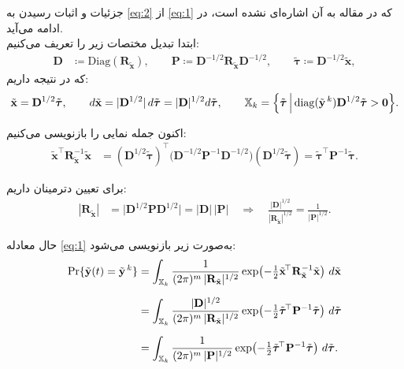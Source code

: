 جزئیات و اثبات رسیدن به
\eqref{eq:2}
از 
\eqref{eq:1}
که در مقاله به آن اشاره‌ای نشده است، در ادامه می‌آید.\\
ابتدا تبدیل مختصات زیر را تعریف می‌کنیم:
\begin{align}
	\mathbf{D} &\coloneqq \mathrm{Diag}(\mathbf{R}_{\tilde{\mathbf{x}}}), \qquad
	\mathbf{P} \coloneqq \mathbf{D}^{-1/2}\mathbf{R}_{\tilde{\mathbf{x}}}\mathbf{D}^{-1/2}, \qquad
	\tilde{\boldsymbol{\tau}} \coloneqq \mathbf{D}^{-1/2}\tilde{\mathbf{x}},
\end{align}
که در نتیجه داریم:
\begin{align}
	\tilde{\mathbf{x}} = \mathbf{D}^{1/2}\tilde{\boldsymbol{\tau}}, \qquad
	d\tilde{\mathbf{x}} = |\mathbf{D}^{1/2}|\,d\tilde{\boldsymbol{\tau}}
	= |\mathbf{D}|^{1/2} d\tilde{\boldsymbol{\tau}}, \qquad
	\mathbb{X}_k = \Bigl\{ \tilde{\boldsymbol{\tau}} \,\Big|\, \mathrm{diag}(\tilde{\mathbf{y}}^{\,k})\mathbf{D}^{1/2}\tilde{\boldsymbol{\tau}} > \mathbf{0} \Bigr\}.
\end{align}

اکنون جمله نمایی را بازنویسی می‌کنیم:
\begin{align}
	\tilde{\mathbf{x}}^{\!\top}\mathbf{R}_{\tilde{\mathbf{x}}}^{-1}\tilde{\mathbf{x}}
	&= (\mathbf{D}^{1/2}\tilde{\boldsymbol{\tau}})^{\!\top}
	\bigl(\mathbf{D}^{-1/2}\mathbf{P}^{-1}\mathbf{D}^{-1/2}\bigr)
	(\mathbf{D}^{1/2}\tilde{\boldsymbol{\tau}})
	= \tilde{\boldsymbol{\tau}}^{\!\top}\mathbf{P}^{-1}\tilde{\boldsymbol{\tau}}.
\end{align}

برای تعیین دترمینان داریم:
\begin{align}
	|\mathbf{R}_{\tilde{\mathbf{x}}}|
	&= \bigl|\mathbf{D}^{1/2}\mathbf{P}\mathbf{D}^{1/2}\bigr|
	= |\mathbf{D}|\,|\mathbf{P}|
	\quad\Longrightarrow\quad
	\frac{|\mathbf{D}|^{1/2}}{|\mathbf{R}_{\tilde{\mathbf{x}}}|^{1/2}}
	= \frac{1}{|\mathbf{P}|^{1/2}}.
\end{align}

حال معادله \eqref{eq:1} به‌صورت زیر بازنویسی می‌شود:
\begin{align}
	\Pr\{\tilde{\mathbf{y}}(t)=\tilde{\mathbf{y}}^{\,k}\}
	&=\int_{\mathbb{X}_k}\frac{1}{(2\pi)^m\,|\mathbf{R}_{\tilde{\mathbf{x}}}|^{1/2}}
	\exp\!\left(-\tfrac{1}{2}\tilde{\mathbf{x}}^{\!\top}\mathbf{R}_{\tilde{\mathbf{x}}}^{-1}\tilde{\mathbf{x}}\right)\,d\tilde{\mathbf{x}} \notag \\[6pt] 
	&=\int_{\mathbb{X}_k}\frac{|\mathbf{D}|^{1/2}}{(2\pi)^m\,|\mathbf{R}_{\tilde{\mathbf{x}}}|^{1/2}}
	\exp\!\left(-\tfrac{1}{2}\tilde{\boldsymbol{\tau}}^{\!\top}\mathbf{P}^{-1}\tilde{\boldsymbol{\tau}}\right)\,d\tilde{\boldsymbol{\tau}} \notag \\[6pt]
	&=\int_{\mathbb{X}_k}\frac{1}{(2\pi)^m\,|\mathbf{P}|^{1/2}}
	\exp\!\left(-\tfrac{1}{2}\tilde{\boldsymbol{\tau}}^{\!\top}\mathbf{P}^{-1}\tilde{\boldsymbol{\tau}}\right)\,d\tilde{\boldsymbol{\tau}}.
\end{align}

